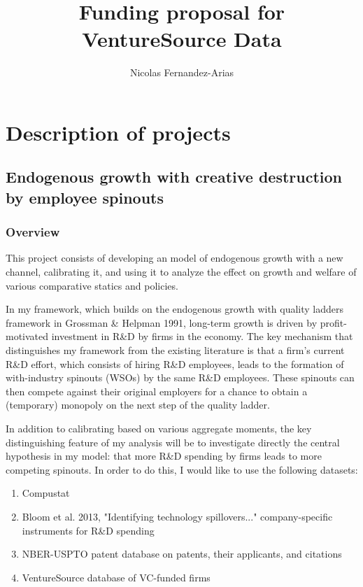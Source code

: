\documentclass[12pt,english]{article}
\theoremstyle{remark}
\begin{document}
	
\title{Funding proposal for VentureSource Data}
\author{Nicolas Fernandez-Arias}
\maketitle

\section{Description of projects}

\subsection{Endogenous growth with creative destruction by employee spinouts}

\subsubsection{Overview}

This project consists of developing an model of endogenous growth with a new channel, 
calibrating it, and using it to analyze the effect on growth and welfare of various comparative statics and policies. 

In my framework, which builds on the endogenous growth with quality ladders framework in Grossman \& Helpman 1991, long-term growth is driven by profit-motivated investment in R\&D by firms in the economy. The key mechanism that distinguishes my framework from the existing literature is that a firm's current R\&D effort, which consists of hiring R\&D employees, leads to the formation of with-industry spinouts (WSOs) by the same R\&D employees. These spinouts can then compete against their original employers for a chance to obtain a (temporary) monopoly on the next step of the quality ladder. 

In addition to calibrating based on various aggregate moments, the key distinguishing feature of my analysis will be to investigate directly the central hypothesis in my model: that more R\&D spending by firms leads to more competing spinouts. In order to do this, I would like to use the following datasets:

\begin{enumerate}
	\item Compustat
	\item Bloom et al. 2013, "Identifying technology spillovers..." company-specific instruments for R\&D spending
	\item NBER-USPTO patent database on patents, their applicants, and citations
	\item VentureSource database of VC-funded firms
\end{enumerate}
\end{document}
